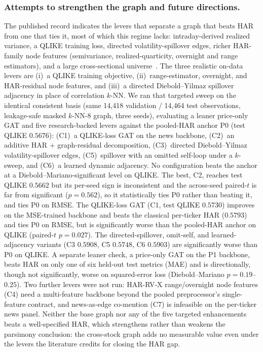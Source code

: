 \documentclass[runningheads]{llncs}
\newcommand{\nval}{14{,}418}
\newcommand{\ntest}{14{,}464}
\begin{document}
\subsubsection{Attempts to strengthen the graph and future directions.}
The published record indicates the levers that separate a graph that beats HAR from one that ties it, most
of which this regime lacks: intraday-derived realized variance, a QLIKE training loss, directed
volatility-spillover edges, richer HAR-family node features (semivariance, realized-quarticity, overnight
and range estimators), and a large cross-sectional universe~\cite{zhang2025gnnhar,audrino2025,bpq2016}. The
three realistic on-data levers are (i)~a QLIKE training objective, (ii)~range-estimator, overnight, and
HAR-residual node features, and (iii)~a directed Diebold--Yilmaz spillover adjacency in place of
correlation $k$-NN. We ran that targeted sweep on the identical consistent basis (same \nval{}
validation / \ntest{} test observations, leakage-safe masked $k$-NN-8 graph, three seeds), evaluating a
leaner price-only GAT and five research-backed levers against the pooled-HAR anchor P0 (test QLIKE
$0.5676$): (C1)~a QLIKE-loss GAT on the news backbone, (C2)~an additive HAR $+$ graph-residual
decomposition, (C3)~directed Diebold--Yilmaz volatility-spillover edges, (C5)~spillover with an omitted
self-loop under a $k$-sweep, and (C6)~a learned dynamic adjacency. No configuration beats the anchor at a
Diebold--Mariano-significant level on QLIKE. The best, C2, reaches test QLIKE $0.5662$ but its per-seed
sign is inconsistent and the across-seed paired-$t$ is far from significant ($p=0.562$), so it
statistically ties P0 rather than beating it, and ties P0 on RMSE. The QLIKE-loss GAT (C1, test QLIKE
$0.5730$) improves on the MSE-trained backbone and beats the classical per-ticker HAR ($0.5793$) and ties
P0 on RMSE, but is significantly worse than the pooled-HAR anchor on QLIKE (paired-$t$ $p=0.027$). The
directed-spillover, omit-self, and learned-adjacency variants (C3 $0.5908$, C5 $0.5748$, C6 $0.5903$) are
significantly worse than P0 on QLIKE. A separate leaner check, a price-only GAT on the P1 backbone, beats
HAR on only one of six held-out test metrics (MAE) and is directionally, though not significantly, worse
on squared-error loss (Diebold--Mariano $p=0.19$--$0.25$). Two further levers were not run: HAR-RV-X
range/overnight node features (C4) need a multi-feature backbone beyond the pooled preprocessor's
single-feature contract, and news-as-edge co-mention (C7) is infeasible on the per-ticker news panel.
Neither the base graph nor any of the five targeted enhancements beats a well-specified HAR, which
strengthens rather than weakens the parsimony conclusion: the cross-stock graph adds no measurable value
even under the levers the literature credits for closing the HAR gap.
\end{document}
